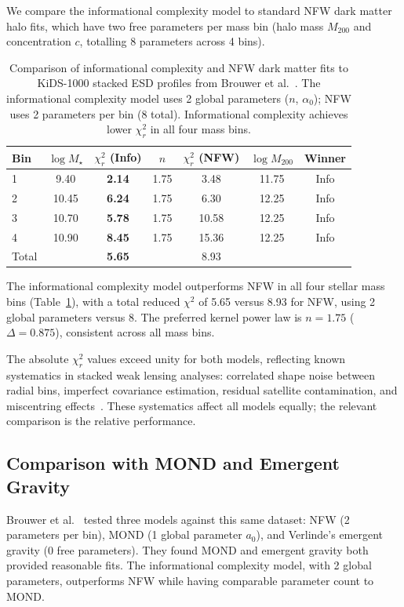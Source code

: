 \documentclass[12pt,a4paper]{article}
\begin{document}
We compare the informational complexity model to standard NFW dark matter halo fits, which have two free parameters per mass bin (halo mass $M_{200}$ and concentration $c$, totalling 8 parameters across 4 bins).

\begin{table}[ht]
\centering
\begin{tabular}{lcccccc}
\hline\hline
Bin & $\log M_\star$ & $\chi^2_r$ (Info) & $n$ & $\chi^2_r$ (NFW) & $\log M_{200}$ & Winner \\
\hline
1 & 9.40  & \textbf{2.14} & 1.75 & 3.48  & 11.75 & Info \\
2 & 10.45 & \textbf{6.24} & 1.75 & 6.30  & 12.25 & Info \\
3 & 10.70 & \textbf{5.78} & 1.75 & 10.58 & 12.25 & Info \\
4 & 10.90 & \textbf{8.45} & 1.75 & 15.36 & 12.25 & Info \\
\hline
Total & & \textbf{5.65} & & 8.93 & & \\
\hline\hline
\end{tabular}
\caption{Comparison of informational complexity and NFW dark matter fits to KiDS-1000 stacked ESD profiles from Brouwer et al.~\cite{Brouwer2021}. The informational complexity model uses 2 global parameters ($n$, $\alpha_0$); NFW uses 2 parameters per bin (8 total). Informational complexity achieves lower $\chi^2_r$ in all four mass bins.}
\label{tab:kids}
\end{table}

The informational complexity model outperforms NFW in all four stellar mass bins (Table~\ref{tab:kids}), with a total reduced $\chi^2$ of 5.65 versus 8.93 for NFW, using 2 global parameters versus 8. The preferred kernel power law is $n = 1.75$ ($\Delta = 0.875$), consistent across all mass bins.

The absolute $\chi^2_r$ values exceed unity for both models, reflecting known systematics in stacked weak lensing analyses: correlated shape noise between radial bins, imperfect covariance estimation, residual satellite contamination, and miscentring effects~\cite{Brouwer2021}. These systematics affect all models equally; the relevant comparison is the relative performance.

\subsection{Comparison with MOND and Emergent Gravity}

Brouwer et al.~\cite{Brouwer2021} tested three models against this same dataset: NFW (2 parameters per bin), MOND (1 global parameter $a_0$), and Verlinde's emergent gravity (0 free parameters). They found MOND and emergent gravity both provided reasonable fits. The informational complexity model, with 2 global parameters, outperforms NFW while having comparable parameter count to MOND.
\end{document}
